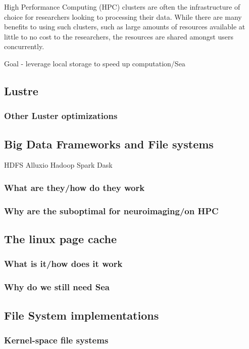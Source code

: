 \documentclass[10pt,journal,compsoc]{IEEEtran}
\begin{document}
High Performance Computing (HPC) clusters are often the infrastructure of choice for researchers looking to processing their data.
While there are many benefits to using such clusters, such as large amounts of resources available at little to no cost to
the researchers, the resources are shared amongst users concurrently. 


Goal - leverage local storage to speed up computation/Sea


\subsection{Lustre}
\subsubsection{Other Luster optimizations}
\subsection{Big Data Frameworks and File systems}
HDFS Alluxio Hadoop Spark Dask
\subsubsection{What are they/how do they work}
\subsubsection{Why are the suboptimal for neuroimaging/on HPC}
\subsection{The linux page cache}
\subsubsection{What is it/how does it work}
\subsubsection{Why do we still need Sea}
\subsection{File System implementations}
\subsubsection{Kernel-space file systems}
\end{document}
